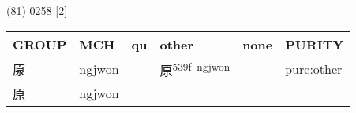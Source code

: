 \documentclass[14pt,a4paper]{scrartcl}
\begin{document}
(81) 0258 {[}2{]}

\begin{longtable}[c]{@{}llllll@{}}
\toprule
\begin{minipage}[b]{0.14\columnwidth}\raggedright\strut
GROUP
\strut\end{minipage} &
\begin{minipage}[b]{0.14\columnwidth}\raggedright\strut
MCH
\strut\end{minipage} &
\begin{minipage}[b]{0.14\columnwidth}\raggedright\strut
qu
\strut\end{minipage} &
\begin{minipage}[b]{0.14\columnwidth}\raggedright\strut
other
\strut\end{minipage} &
\begin{minipage}[b]{0.14\columnwidth}\raggedright\strut
none
\strut\end{minipage} &
\begin{minipage}[b]{0.14\columnwidth}\raggedright\strut
PURITY
\strut\end{minipage}\tabularnewline
\midrule
\endhead
\begin{minipage}[t]{0.14\columnwidth}\raggedright\strut
厡
\strut\end{minipage} &
\begin{minipage}[t]{0.14\columnwidth}\raggedright\strut
ngjwon
\strut\end{minipage} &
\begin{minipage}[t]{0.14\columnwidth}\raggedright\strut
\strut\end{minipage} &
\begin{minipage}[t]{0.14\columnwidth}\raggedright\strut
原\textsuperscript{539f~ngjwon}
\strut\end{minipage} &
\begin{minipage}[t]{0.14\columnwidth}\raggedright\strut
\strut\end{minipage} &
\begin{minipage}[t]{0.14\columnwidth}\raggedright\strut
pure:other
\strut\end{minipage}\tabularnewline
\begin{minipage}[t]{0.14\columnwidth}\raggedright\strut
原
\strut\end{minipage} &
\begin{minipage}[t]{0.14\columnwidth}\raggedright\strut
ngjwon
\strut\end{minipage} &
\begin{minipage}[t]{0.14\columnwidth}\raggedright\strut

\end{minipage}
\end{longtable}
\end{document}
